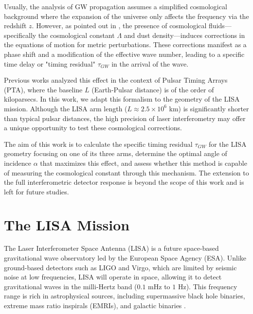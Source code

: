 \documentclass[twocolumn]{revtex4-2}
\begin{document}
Usually, the analysis of GW propagation assumes a simplified cosmological background where the expansion of the universe only affects the frequency via the redshift $z$. However, as pointed out in \cite{espriu2021}, the presence of cosmological fluids---specifically the cosmological constant $\Lambda$ and dust density---induces corrections in the equations of motion for metric perturbations. These corrections manifest as a phase shift and a modification of the effective wave number, leading to a specific time delay or "timing residual" $\tau_{GW}$ in the arrival of the wave.

Previous works analyzed this effect in the context of Pulsar Timing Arrays (PTA), where the baseline $L$ (Earth-Pulsar distance) is of the order of kiloparsecs. In this work, we adapt this formalism to the geometry of the LISA mission. Although the LISA arm length ($L \approx 2.5 \times 10^6$ km) is significantly shorter than typical pulsar distances, the high precision of laser interferometry may offer a unique opportunity to test these cosmological corrections.

The aim of this work is to calculate the specific timing residual $\tau_{GW}$ for the LISA geometry focusing on one of its three arms, determine the optimal angle of incidence $\alpha$ that maximizes this effect, and assess whether this method is capable of measuring the cosmological constant through this mechanism. The extension to the full interferometric detector response is beyond the scope of this work and is left for future studies.


\section{The LISA Mission}

The Laser Interferometer Space Antenna (LISA) is a future space-based gravitational wave observatory led by the European Space Agency (ESA). Unlike ground-based detectors such as LIGO and Virgo, which are limited by seismic noise at low frequencies, LISA will operate in space, allowing it to detect gravitational waves in the milli-Hertz band ($0.1$ mHz to $1$ Hz). This frequency range is rich in astrophysical sources, including supermassive black hole binaries, extreme mass ratio inspirals (EMRIs), and galactic binaries \cite{AmaroSeoane2017}.
\end{document}
